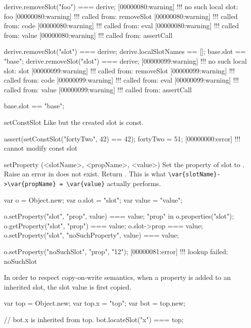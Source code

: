 \begin{urbiscriptapi}
\begin{urbiassert}
derive.removeSlot("foo") === derive;
[00000080:warning] !!! no such local slot: foo
[00000080:warning] !!!    called from: removeSlot
[00000080:warning] !!!    called from: code
[00000080:warning] !!!    called from: eval
[00000080:warning] !!!    called from: value
[00000080:warning] !!!    called from: assertCall

derive.removeSlot("slot") === derive;
derive.localSlotNames == [];
base.slot == "base";
derive.removeSlot("slot") === derive;
[00000099:warning] !!! no such local slot: slot
[00000099:warning] !!!    called from: removeSlot
[00000099:warning] !!!    called from: code
[00000099:warning] !!!    called from: eval
[00000099:warning] !!!    called from: value
[00000099:warning] !!!    called from: assertCall

base.slot == "base";
\end{urbiassert}


\item[setConstSlot]%
  Like  but the created slot is const.
\begin{urbiscript}
assert(setConstSlot("fortyTwo", 42) == 42);
fortyTwo = 51;
[00000000:error] !!! cannot modify const slot
\end{urbiscript}


\item[setProperty](<slotName>, <propName>, <value>)%
  Set the property  of slot  to .
  Raise an error in  does not exist.  Return .
  This is what \lstinline|\var{slotName}->\var{propName} = \var{value}|
  actually performs.
\begin{urbiassert}
var o = Object.new;
var o.slot = "slot";
var value = "value";

o.setProperty("slot", "prop", value) === value;
"prop" in o.properties("slot");
o.getProperty("slot", "prop") === value;
o.slot->prop === value;
o.setProperty("slot", "noSuchProperty", value) === value;

o.setProperty("noSuchSlot", "prop", "12");
[00000081:error] !!! lookup failed: noSuchSlot
\end{urbiassert}

  In order to respect copy-on-write semantics, when a property is added to
  an inherited slot, the slot value is first copied.

\begin{urbiassert}
var top = Object.new;
var top.x = "top";
var bot = top.new;

// bot.x is inherited from top.
bot.locateSlot("x") === top;


\end{urbiassert}
\end{urbiscriptapi}
